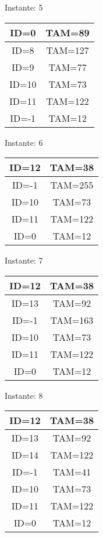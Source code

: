 \documentclass[10pt,a4paper]{article}
\begin{document}
\begin{center}

Instante: 5

\begin{tabular}{|c|c|}
\hline
ID=0 & TAM=89 \\ \hline
ID=8 & TAM=127 \\ \hline
ID=9 & TAM=77 \\ \hline
ID=10 & TAM=73 \\ \hline
ID=11 & TAM=122 \\ \hline
ID=-1 & TAM=12 \\ \hline
\end{tabular}
\end{center}\pagebreak
\begin{center}

Instante: 6

\begin{tabular}{|c|c|}
\hline
ID=12 & TAM=38 \\ \hline
ID=-1 & TAM=255 \\ \hline
ID=10 & TAM=73 \\ \hline
ID=11 & TAM=122 \\ \hline
ID=0 & TAM=12 \\ \hline
\end{tabular}
\end{center}\pagebreak
\begin{center}

Instante: 7

\begin{tabular}{|c|c|}
\hline
ID=12 & TAM=38 \\ \hline
ID=13 & TAM=92 \\ \hline
ID=-1 & TAM=163 \\ \hline
ID=10 & TAM=73 \\ \hline
ID=11 & TAM=122 \\ \hline
ID=0 & TAM=12 \\ \hline
\end{tabular}
\end{center}\pagebreak
\begin{center}

Instante: 8

\begin{tabular}{|c|c|}
\hline
ID=12 & TAM=38 \\ \hline
ID=13 & TAM=92 \\ \hline
ID=14 & TAM=122 \\ \hline
ID=-1 & TAM=41 \\ \hline
ID=10 & TAM=73 \\ \hline
ID=11 & TAM=122 \\ \hline
ID=0 & TAM=12 \\ \hline
\end{tabular}
\end{center}\pagebreak
\end{document}
